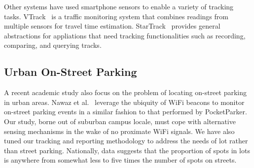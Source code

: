 Other systems have used smartphone sensors to enable a variety of tracking
tasks. VTrack~\cite{Thiagarajan:2009:VAE} is a traffic monitoring system that
combines readings from multiple sensors for travel time estimation.
StarTrack~\cite{Ananthanarayanan:2009:SFE} provides general abstractions for
appliations that need tracking functionalities such as recording, comparing, and
querying tracks.

\subsection{Urban On-Street Parking}

A recent academic study also focus on the problem of locating on-street
parking in urban areas.  Nawaz et al.~\cite{Nawaz:2013:PSB} leverage the ubiquity of WiFi
beacons to monitor on-street parking events in a similar fashion to that
performed by PocketParker.  Our study, borne out of suburban campus locale,
must cope with alternative sensing mechanisms in the wake of no proximate WiFi
signals.  We have also tuned our tracking and reporting methodology to address
the needs of lot rather than street parking.  Nationally, data suggests that
the proportion of spots in lots is anywhere from somewhat less to five times
the number of spots on streets.~\cite{Environ}
